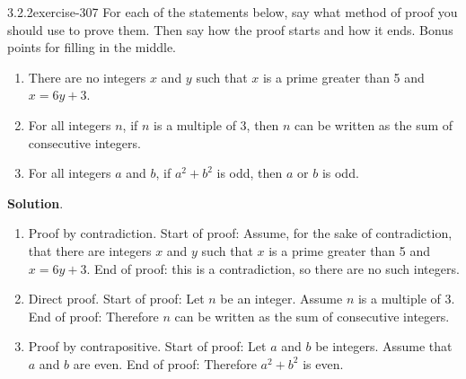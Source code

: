 \documentclass[twoside,11pt,]{book}
\numberwithin{equation}{chapter}
\begin{document}
\begin{divisionsolution}{3.2.2}{}{exercise-307}%
\hypertarget{p-4116}{}%
For each of the statements below, say what method of proof you should use to prove them. Then say how the proof starts and how it ends. Bonus points for filling in the middle.\leavevmode%
\begin{enumerate}[label=(\alph*)]
\item\hypertarget{li-2123}{}\hypertarget{p-4117}{}%
There are no integers \(x\) and \(y\) such that \(x\) is a prime greater than 5 and \(x = 6y + 3\).%
\item\hypertarget{li-2124}{}\hypertarget{p-4118}{}%
For all integers \(n\), if \(n\) is a multiple of 3, then \(n\) can be written as the sum of consecutive integers.%
\item\hypertarget{li-2125}{}\hypertarget{p-4119}{}%
For all integers \(a\) and \(b\), if \(a^2 + b^2\) is odd, then \(a\) or \(b\) is odd.%
\end{enumerate}
%
\par\smallskip%
\noindent\textbf{Solution}.\quad%
\hypertarget{p-4120}{}%
\leavevmode%
\begin{enumerate}[label=(\alph*)]
\item\hypertarget{li-2126}{}\hypertarget{p-4121}{}%
Proof by contradiction. Start of proof: Assume, for the sake of contradiction, that there are integers \(x\) and \(y\) such that \(x\) is a prime greater than 5 and \(x = 6y + 3\). End of proof: \textellipsis{} this is a contradiction, so there are no such integers.%
\item\hypertarget{li-2127}{}\hypertarget{p-4122}{}%
Direct proof. Start of proof: Let \(n\) be an integer. Assume \(n\) is a multiple of 3. End of proof: Therefore \(n\) can be written as the sum of consecutive integers.%
\item\hypertarget{li-2128}{}\hypertarget{p-4123}{}%
Proof by contrapositive. Start of proof: Let \(a\) and \(b\) be integers. Assume that \(a\) and \(b\) are even. End of proof: Therefore \(a^2 + b^2\) is even.%
\end{enumerate}
%
\end{divisionsolution}%
\end{document}
